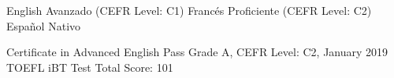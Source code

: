 \twocolumnsection
{
    \begin{keywords}
        \keywordsentry
        {English}
        {Avanzado (CEFR Level: C1)}
        \keywordsentry
        {Francés}
        {Proficiente (CEFR Level: C2)}
        \keywordsentry
        {Español}
        {Nativo}
    \end{keywords}
}
{
    \begin{keywords}
        \keywordsentry
        {Certificate in Advanced English}
        {Pass Grade A, CEFR Level: C2, January 2019}
        \keywordsentry
        {TOEFL iBT Test}
        {Total Score: 101}
    \end{keywords}
}